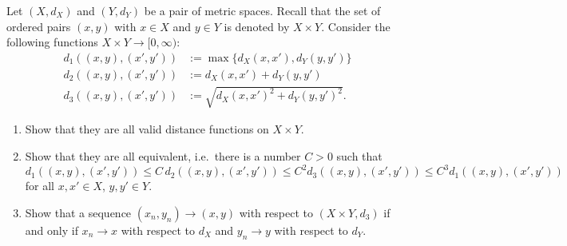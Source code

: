 \begin{exercise}
\label{ex:product_metric_spaces}
Let $(X, d_X)$ and $(Y, d_Y)$ be a pair of metric spaces. Recall that the set of ordered pairs
$(x,y)$ with $x \in X$ and $y \in Y$ is denoted by $X \times Y$. Consider the following functions
$X \times Y \to [0,\infty)$:
$$
\begin{aligned}
d_1((x,y),(x',y')) &:= \max\{d_X(x,x'), d_Y(y,y')\} \\
d_2((x,y),(x',y')) &:= d_X(x,x') + d_Y(y,y') \\
d_3((x,y),(x',y')) &:= \sqrt{d_X(x,x')^2 + d_Y(y,y')^2}.
\end{aligned}
$$
\begin{enumerate}[label=\textbf{(\alph*)}]
  \item Show that they are all valid distance functions on $X \times Y$.
  \item Show that they are all equivalent, i.e.\ there is a number $C > 0$ such that
    $$d_1((x,y),(x',y')) \leq C\,d_2((x,y),(x',y')) \leq C^2 d_3((x,y),(x',y')) \leq C^3 d_1((x,y),(x',y'))$$
    for all $x, x' \in X$, $y, y' \in Y$.
  \item Show that a sequence $(x_n, y_n) \to (x,y)$ with respect to $(X \times Y, d_3)$ if and
    only if $x_n \to x$ with respect to $d_X$ and $y_n \to y$ with respect to $d_Y$.
\end{enumerate}
\end{exercise}
